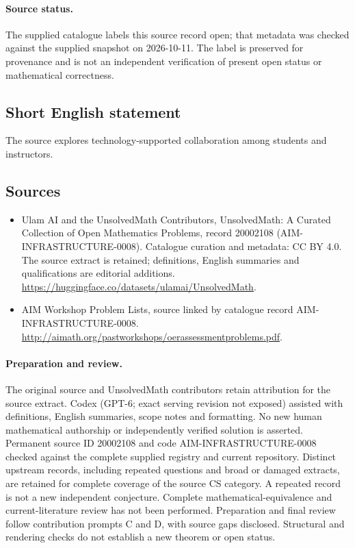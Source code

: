 \documentclass[11pt]{article}
\begin{document}
\paragraph{Source status.}
The supplied catalogue labels this source record open; that metadata was checked against the supplied snapshot on 2026-10-11. The label is preserved for provenance and is not an independent verification of present open status or mathematical correctness.
\subsection{Short English statement}
The source explores technology-supported collaboration among students and instructors.
\subsection{Sources}
\begin{itemize}
\item[\hypertarget{source:20002108:1}{S1}] Ulam AI and the UnsolvedMath Contributors, UnsolvedMath: A Curated Collection of Open Mathematics Problems, record 20002108 (AIM-INFRASTRUCTURE-0008). Catalogue curation and metadata: CC BY 4.0. The source extract is retained; definitions, English summaries and qualifications are editorial additions.
\url{https://huggingface.co/datasets/ulamai/UnsolvedMath}.
\item[\hypertarget{source:20002108:2}{S2}] AIM Workshop Problem Lists, source linked by catalogue record AIM-INFRASTRUCTURE-0008.
\url{http://aimath.org/pastworkshops/oerassessmentproblems.pdf}.
\end{itemize}
\paragraph{Preparation and review.}
The original source and UnsolvedMath contributors retain attribution for the source extract. Codex (GPT-6; exact serving revision not exposed) assisted with definitions, English summaries, scope notes and formatting. No new human mathematical authorship or independently verified solution is asserted. Permanent source ID 20002108 and code AIM-INFRASTRUCTURE-0008 checked against the complete supplied registry and current repository. Distinct upstream records, including repeated questions and broad or damaged extracts, are retained for complete coverage of the source CS category. A repeated record is not a new independent conjecture. Complete mathematical-equivalence and current-literature review has not been performed. Preparation and final review follow contribution prompts C and D, with source gaps disclosed. Structural and rendering checks do not establish a new theorem or open status.
\label{end:20002108}
\end{document}
